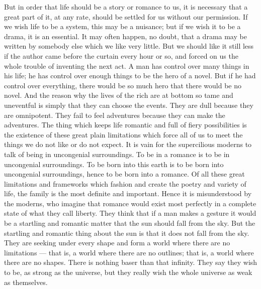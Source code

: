 But in order that life should be a story or romance to us, it is necessary that a great part of it, at any rate, should be settled for us without our permission. If we wish life to be a system, this may be a nuisance; but if we wish it to be a drama, it is an essential. It may often happen, no doubt, that a drama may be written by somebody else which we like very little. But we should like it still less if the author came before the curtain every hour or so, and forced on us the whole trouble of inventing the next act. A man has control over many things in his life; he has control over enough things to be the hero of a novel. But if he had control over everything, there would be so much hero that there would be no novel. And the reason why the lives of the rich are at bottom so tame and uneventful is simply that they can choose the events. They are dull because they are omnipotent. They fail to feel adventures because they can make the adventures. The thing which keeps life romantic and full of fiery possibilities is the existence of these great plain limitations which force all of us to meet the things we do not like or do not expect. It is vain for the supercilious moderns to talk of being in uncongenial surroundings. To be in a romance is to be in uncongenial surroundings. To be born into this earth is to be born into uncongenial surroundings, hence to be born into a romance. Of all these great limitations and frameworks which fashion and create the poetry and variety of life, the family is the most definite and important. Hence it is misunderstood by the moderns, who imagine that romance would exist most perfectly in a complete state of what they call liberty. They think that if a man makes a gesture it would be a startling and romantic matter that the sun should fall from the sky. But the startling and romantic thing about the sun is that it does not fall from the sky. They are seeking under every shape and form a world where there are no limitations — that is, a world where there are no outlines; that is, a world where there are no shapes. There is nothing baser than that infinity. They say they wish to be, as strong as the universe, but they really wish the whole universe as weak as themselves.


